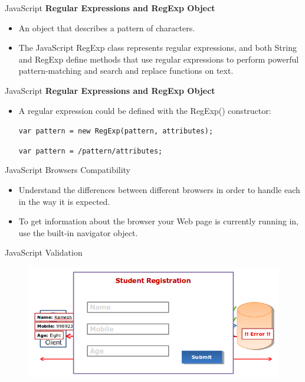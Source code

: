 \documentclass[14pt]{beamer}
\begin{document}
\begin{frame}{JavaScript}
\textbf{Regular Expressions and RegExp Object}
\begin{itemize}
 \item An object that describes a pattern of characters.
 \item The JavaScript RegExp class represents regular expressions, and both String and RegExp define methods that use regular expressions to perform powerful pattern-matching and search and replace functions on text.
\end{itemize}
\end{frame}

\begin{frame}{JavaScript}
\textbf{Regular Expressions and RegExp Object}
\begin{itemize}
 \item A regular expression could be defined with the RegExp() constructor:
 \begin{block}{}
  \lstinline!var pattern = new RegExp(pattern, attributes);!
  
  \lstinline!var pattern = /pattern/attributes;!
 \end{block}
\end{itemize}
\end{frame}

\begin{frame}{JavaScript}
Browsers Compatibility
\begin{itemize}
 \item Understand the differences between different browsers in order to handle each in the way it is expected.
 \item To get information about the browser your Web page is currently running in, use the built-in navigator object.
\end{itemize}
\end{frame}

\begin{frame}{JavaScript}
Validation
\begin{figure}[H]
 \includegraphics[scale=.4]{validation.png}
\end{figure}
\end{frame}
\end{document}
